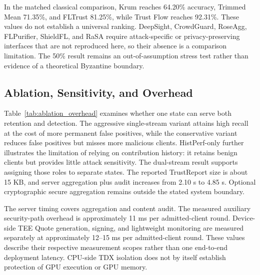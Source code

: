 \documentclass[runningheads,orivec]{llncs}
\begin{document}
In the matched classical comparison, Krum reaches 64.20\% accuracy, Trimmed Mean 71.35\%, and FLTrust 81.25\%, while Trust Flow reaches 92.31\%. These values do not establish a universal ranking. DeepSight, CrowdGuard, RoseAgg, FLPurifier, ShieldFL, and RaSA require attack-specific or privacy-preserving interfaces that are not reproduced here, so their absence is a comparison limitation. The 50\% result remains an out-of-assumption stress test rather than evidence of a theoretical Byzantine boundary.

\subsection{Ablation, Sensitivity, and Overhead}

Table~\ref{tab:ablation_overhead} examines whether one state can serve both retention and detection. The aggressive single-stream variant attains high recall at the cost of more permanent false positives, while the conservative variant reduces false positives but misses more malicious clients. HistPerf-only further illustrates the limitation of relying on contribution history: it retains benign clients but provides little attack sensitivity. The dual-stream result supports assigning those roles to separate states. The reported TrustReport size is about 15 KB, and server aggregation plus audit increases from 2.10 s to 4.85 s. Optional cryptographic secure aggregation remains outside the stated system boundary.

The server timing covers aggregation and content audit. The measured auxiliary security-path overhead is approximately 11 ms per admitted-client round. Device-side TEE Quote generation, signing, and lightweight monitoring are measured separately at approximately 12--15 ms per admitted-client round. These values describe their respective measurement scopes rather than one end-to-end deployment latency. CPU-side TDX isolation does not by itself establish protection of GPU execution or GPU memory.
\end{document}
